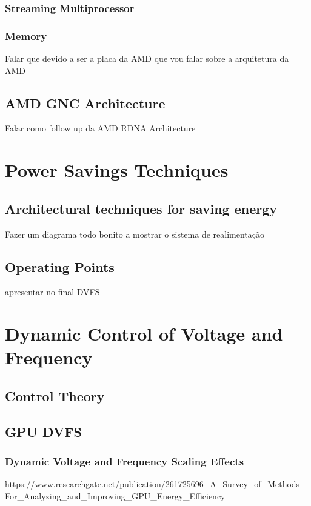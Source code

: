 \subsubsection{Streaming Multiprocessor}
\subsubsection{Memory }

Falar que devido a ser a placa da AMD que vou falar sobre a arquitetura da AMD

\subsection{AMD GNC Architecture}

Falar como follow up da AMD RDNA Architecture
\section{Power Savings Techniques}
\label{section:overview}

\subsection{Architectural techniques for saving energy}
Fazer um diagrama todo bonito a mostrar o sistema de realimentação
\subsection{Operating Points}
\label{section:dvfs}
apresentar no final DVFS 

\section{Dynamic Control of Voltage and Frequency}
\subsection{Control Theory}
\subsection{GPU DVFS}
\subsubsection{Dynamic Voltage and Frequency Scaling Effects}
\label{section:solarch}
https://www.researchgate.net/publication/261725696_A_Survey_of_Methods_For_Analyzing_and_Improving_GPU_Energy_Efficiency

